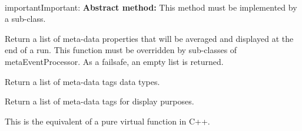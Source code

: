 \documentclass[letterpaper,10pt,english]{sphinxmanual}
\begin{document}
\begin{fulllineitems}

\begin{fulllineitems}
\label{api-doc/mosaic.meta:mosaic.metaEventProcessor.metaEventProcessor.mdAveragePropertiesList}~
\begin{notice}{important}{Important:}
\textbf{Abstract method:} This method must be implemented by a sub-class.
\end{notice}

Return a list of meta-data properties that will be averaged 
and displayed at the end of a run. This function must be overridden
by sub-classes of metaEventProcessor. As a failsafe, an empty list
is returned.

\end{fulllineitems}


\begin{fulllineitems}
\label{api-doc/mosaic.meta:mosaic.metaEventProcessor.metaEventProcessor.mdHeadingDataType}
Return a list of meta-data tags data types.

\end{fulllineitems}


\begin{fulllineitems}
\label{api-doc/mosaic.meta:mosaic.metaEventProcessor.metaEventProcessor.mdHeadings}
Return a list of meta-data tags for display purposes.

\end{fulllineitems}


\begin{fulllineitems}
\label{api-doc/mosaic.meta:mosaic.metaEventProcessor.metaEventProcessor.processEvent}
This is the equivalent of a pure virtual function in C++.

\end{fulllineitems}



\end{fulllineitems}
\end{document}
